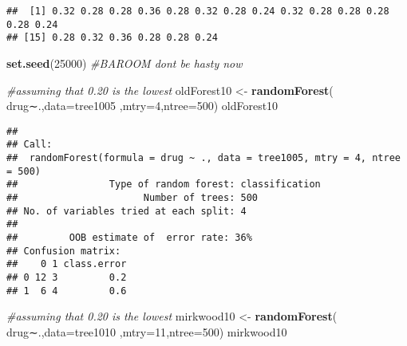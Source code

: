 \documentclass[]{article}
\newenvironment{Shaded}{\begin{snugshade}}{\end{snugshade}}
\newcommand{\KeywordTok}[1]{\textcolor[rgb]{0.13,0.29,0.53}{\textbf{#1}}}
\newcommand{\DataTypeTok}[1]{\textcolor[rgb]{0.13,0.29,0.53}{#1}}
\newcommand{\DecValTok}[1]{\textcolor[rgb]{0.00,0.00,0.81}{#1}}
\newcommand{\StringTok}[1]{\textcolor[rgb]{0.31,0.60,0.02}{#1}}
\newcommand{\CommentTok}[1]{\textcolor[rgb]{0.56,0.35,0.01}{\textit{#1}}}
\newcommand{\ControlFlowTok}[1]{\textcolor[rgb]{0.13,0.29,0.53}{\textbf{#1}}}
\newcommand{\OperatorTok}[1]{\textcolor[rgb]{0.81,0.36,0.00}{\textbf{#1}}}
\newcommand{\NormalTok}[1]{#1}
\begin{document}
\begin{Shaded}
\end{Shaded}

\begin{verbatim}
##  [1] 0.32 0.28 0.28 0.36 0.28 0.32 0.28 0.24 0.32 0.28 0.28 0.28 0.28 0.24
## [15] 0.28 0.32 0.36 0.28 0.28 0.24
\end{verbatim}

\begin{Shaded}
\begin{Highlighting}[]
\KeywordTok{set.seed}\NormalTok{(}\DecValTok{25000}\NormalTok{)}
\CommentTok{#BAROOM dont be hasty now}

\CommentTok{#assuming that 0.20 is the lowest}
\NormalTok{oldForest10 <-}\StringTok{ }\KeywordTok{randomForest}\NormalTok{( drug∼.,}\DataTypeTok{data=}\NormalTok{tree1005  ,}\DataTypeTok{mtry=}\DecValTok{4}\NormalTok{,}\DataTypeTok{ntree=}\DecValTok{500}\NormalTok{)}
\NormalTok{oldForest10}
\end{Highlighting}
\end{Shaded}

\begin{verbatim}
## 
## Call:
##  randomForest(formula = drug ~ ., data = tree1005, mtry = 4, ntree = 500) 
##                Type of random forest: classification
##                      Number of trees: 500
## No. of variables tried at each split: 4
## 
##         OOB estimate of  error rate: 36%
## Confusion matrix:
##    0 1 class.error
## 0 12 3         0.2
## 1  6 4         0.6
\end{verbatim}

\begin{Shaded}
\begin{Highlighting}[]
\CommentTok{#assuming that 0.20 is the lowest}
\NormalTok{mirkwood10 <-}\StringTok{ }\KeywordTok{randomForest}\NormalTok{( drug∼.,}\DataTypeTok{data=}\NormalTok{tree1010  ,}\DataTypeTok{mtry=}\DecValTok{11}\NormalTok{,}\DataTypeTok{ntree=}\DecValTok{500}\NormalTok{)}
\NormalTok{mirkwood10}
\end{Highlighting}
\end{Shaded}
\end{document}
